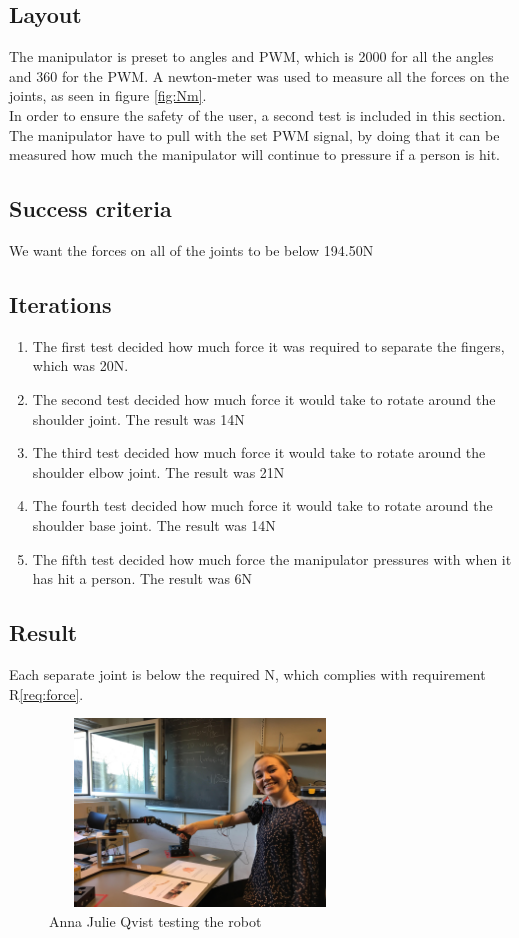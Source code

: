 \subsection*{Layout}
The manipulator is preset to angles and PWM, which is 2000 for all the angles and 360 for the PWM. A newton-meter was used to measure all the forces on the joints, as seen in figure \ref{fig:Nm}.\\
In order to ensure the safety of the user, a second test is included in this section. The manipulator have to pull with the set PWM signal, by doing that it can be measured how much the manipulator will continue to pressure if a person is hit.
\subsection*{Success criteria}
We want the forces on all of the joints to be below 194.50N
\subsection*{Iterations}
\begin{enumerate}
    \item The first test decided how much force it was required to separate the fingers, which was 20N.
    \item The second test decided how much force it would take to rotate around the shoulder joint.
    The result was 14N
    \item The third test decided how much force it would take to rotate around the shoulder elbow joint. The result was 21N
    \item The fourth test decided how much force it would take to rotate around the shoulder base joint. The result was 14N
    \item The fifth test decided how much force the manipulator pressures with when it has hit a person. The result was 6N
    \end{enumerate}
\subsection*{Result}
Each separate joint is below the required N, which complies with requirement R\ref{req:force}.\\
\newpage


\begin{figure}[H]
    \centering
    \includegraphics[width=8cm,height=5cm]{Figures/Technical_figures/anna.jpg}
    \caption{Anna Julie Qvist testing the robot}
    \label{fig:Anna}
\end{figure}

